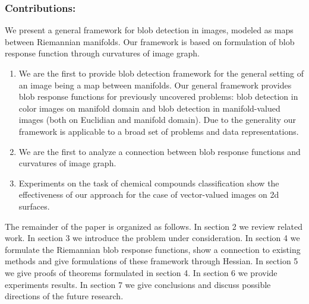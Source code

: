 \documentclass{llncs}
\begin{document}
\subsubsection{Contributions:}
We present a general framework for blob detection in images, modeled as maps between Riemannian manifolds. Our framework is based on formulation of blob response function through curvatures of image graph.
\begin{enumerate}
\item We are the first to provide blob detection framework for the general setting of an image being a map between manifolds. Our general framework provides blob response functions for previously uncovered problems: blob detection in color images on manifold domain and blob detection in manifold-valued images (both on Euclidian and manifold domain). Due to the generality our framework is applicable to a broad set of problems and data representations. 
\item We are the first to analyze a connection between blob response functions and curvatures of image graph.
\item Experiments on the task of chemical compounds classification show the effectiveness of our approach for the case of vector-valued images on 2d surfaces.  
\end{enumerate}

The remainder of the paper is organized as follows. In section 2 we review related work. In section 3 we introduce the problem under consideration. In section 4 we formulate the Riemannian blob response functions, show a connection to existing methods and give formulations of these framework through Hessian. In section 5 we give proofs of theorems formulated in section 4. In section 6 we provide experiments results. In section 7 we give conclusions and discuss possible directions of the future research.
\end{document}

